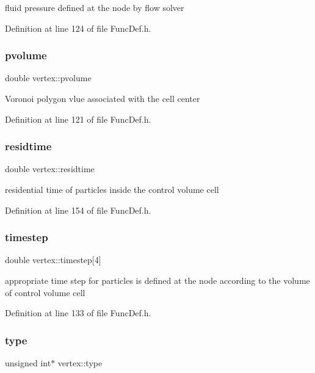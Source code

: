 fluid pressure defined at the node by flow solver 

Definition at line 124 of file Func\+Def.\+h.

\mbox{\label{structvertex_a7cf1594124712ff00a9e4d00926f1010}} 
\subsubsection{\texorpdfstring{pvolume}{pvolume}}
{\footnotesize\ttfamily double vertex\+::pvolume}

Voronoi polygon vlue associated with the cell center 

Definition at line 121 of file Func\+Def.\+h.

\mbox{\label{structvertex_a6ee9434e764f4105136cb10a8c5be642}} 
\subsubsection{\texorpdfstring{residtime}{residtime}}
{\footnotesize\ttfamily double vertex\+::residtime}

residential time of particles inside the control volume cell 

Definition at line 154 of file Func\+Def.\+h.

\mbox{\label{structvertex_a5e4c0ee67478edf757b52b50859dd25e}} 
\subsubsection{\texorpdfstring{timestep}{timestep}}
{\footnotesize\ttfamily double vertex\+::timestep\mbox{[}4\mbox{]}}

appropriate time step for particles is defined at the node according to the volume of control volume cell 

Definition at line 133 of file Func\+Def.\+h.

\mbox{\label{structvertex_aeabf5788639be2723927c854aa11cd33}} 
\subsubsection{\texorpdfstring{type}{type}}
{\footnotesize\ttfamily unsigned int$\ast$ vertex\+::type}

